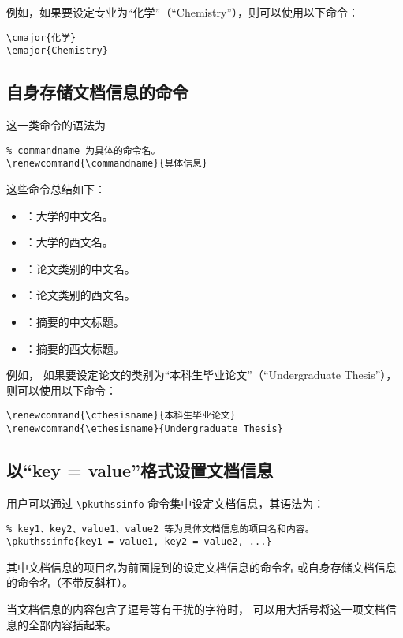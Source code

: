 例如，如果要设定专业为“化学”（“Chemistry”），则可以使用以下命令：
\begin{Verbatim}
\cmajor{化学}
\emajor{Chemistry}
\end{Verbatim}

\subsection{自身存储文档信息的命令}

这一类命令的语法为
\begin{Verbatim}
% commandname 为具体的命令名。
\renewcommand{\commandname}{具体信息}
\end{Verbatim}

这些命令总结如下：
\begin{itemize}
	\item \texttt{\bfseries\string\cuniversity}：大学的中文名。
	\item \texttt{\bfseries\string\euniversity}：大学的西文名。
	\item \texttt{\bfseries\string\cthesisname}：论文类别的中文名。
	\item \texttt{\bfseries\string\ethesisname}：论文类别的西文名。
	\item \texttt{\bfseries\string\cabstractname}：摘要的中文标题。
	\item \texttt{\bfseries\string\eabstractname}：摘要的西文标题。
\end{itemize}

例如，
如果要设定论文的类别为“本科生毕业论文”（“Undergraduate Thesis”），
则可以使用以下命令：
\begin{Verbatim}
\renewcommand{\cthesisname}{本科生毕业论文}
\renewcommand{\ethesisname}{Undergraduate Thesis}
\end{Verbatim}

\subsection{以“key = value”格式设置文档信息}

用户可以通过 \verb|\pkuthssinfo| 命令集中设定文档信息，其语法为：
\begin{Verbatim}
% key1、key2、value1、value2 等为具体文档信息的项目名和内容。
\pkuthssinfo{key1 = value1, key2 = value2, ...}
\end{Verbatim}
其中文档信息的项目名为前面提到的设定文档信息的命令名
或自身存储文档信息的命令名（不带反斜杠）。

当文档信息的内容包含了逗号等有干扰的字符时，
可以用大括号将这一项文档信息的全部内容括起来。

